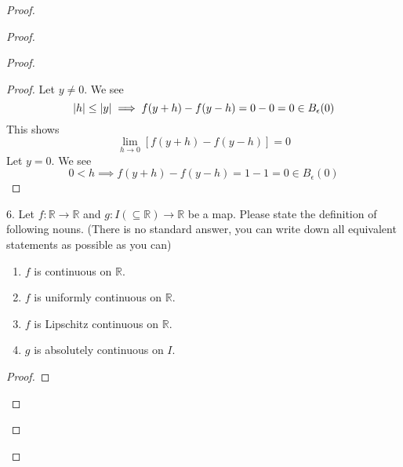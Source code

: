 \documentclass{report}
\begin{document}
\begin{proof}
\begin{proof}
\begin{proof}
\begin{proof}
Let $y\neq 0$. We see  
\begin{equation*}
|h|\leq |y|\implies f(y+h)-f(y-h)=0-0=0\in B_\epsilon (0)
\end{equation*}
This shows 
\begin{equation*}
\lim_{h\to 0}[f(y+h)-f(y-h)]=0
\end{equation*}
Let $y=0$. We see  
\begin{equation*}
0<h\implies f(y+h)-f(y-h)=1-1=0\in B_\epsilon (0)
\end{equation*}
\end{proof}
\begin{question}{}{}
6. Let \( f: \mathbb{R} \rightarrow \mathbb{R} \) and \( g : I (\subseteq \mathbb{R}) \rightarrow \mathbb{R} \) be a map. Please state the definition of following nouns.
(There is no standard answer, you can write down all equivalent statements as possible as you can)
\begin{enumerate}
    \item \( f \) is continuous on \( \mathbb{R} \).
    \item \( f \) is uniformly continuous on \( \mathbb{R} \).
    \item \( f \) is Lipschitz continuous on \( \mathbb{R} \).
    \item \( g \) is absolutely continuous on \( I \).
\end{enumerate}
\end{question}
\begin{proof}


\end{proof}
\end{proof}
\end{proof}
\end{proof}
\end{document}
